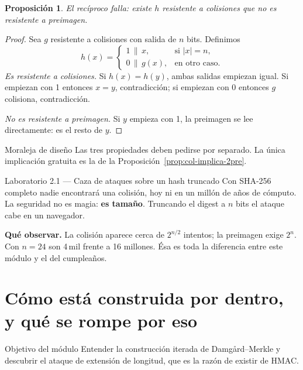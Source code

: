 \documentclass[11pt,a4paper]{article}
\theoremstyle{definition}
\theoremstyle{plain}
\newtheorem{proposicion}{Proposición}
\theoremstyle{remark}
\newcommand{\concat}{\,\|\,}
\begin{document}
\begin{proposicion}\label{prop:reciproco}
El recíproco falla: existe $h$ resistente a colisiones que \emph{no} es
resistente a preimagen.
\end{proposicion}

\begin{proof}
Sea $g$ resistente a colisiones con salida de $n$ bits. Definimos
\[
  h(x) =
  \begin{cases}
    1 \concat x, & \text{si } |x| = n,\\[2pt]
    0 \concat g(x), & \text{en otro caso.}
  \end{cases}
\]
\emph{Es resistente a colisiones.} Si $h(x) = h(y)$, ambas salidas empiezan
igual. Si empiezan con 1 entonces $x = y$, contradicción; si empiezan con 0
entonces $g$ colisiona, contradicción.

\emph{No es resistente a preimagen.} Si $y$ empieza con 1, la preimagen se lee
directamente: es el resto de $y$.
\end{proof}

\begin{nota}{Moraleja de diseño}
Las tres propiedades deben pedirse por separado. La única implicación gratuita es
la de la Proposición~\ref{prop:col-implica-2pre}.
\end{nota}

\begin{laboratorio}{Laboratorio 2.1 — Caza de ataques sobre un hash truncado}
Con SHA-256 completo nadie encontrará una colisión, hoy ni en un millón de años
de cómputo. La seguridad no es magia: \textbf{es tamaño}. Truncando el digest a
$n$ bits el ataque cabe en un navegador.

\textbf{Qué observar.} La colisión aparece cerca de $2^{n/2}$ intentos; la
preimagen exige $2^{n}$. Con $n = 24$ son 4\,mil frente a 16 millones. Ésa es
toda la diferencia entre este módulo y el del cumpleaños.
\end{laboratorio}

\section{Cómo está construida por dentro, y qué se rompe por eso}

\begin{nota}{Objetivo del módulo}
Entender la construcción iterada de Damgård--Merkle y descubrir el ataque de
extensión de longitud, que es la razón de existir de HMAC.
\end{nota}
\end{document}
